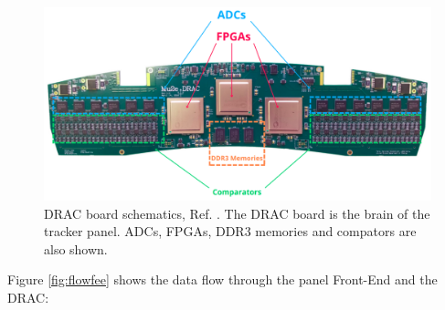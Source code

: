 \begin{figure}[!h]
\centering
\includegraphics[width =\textwidth]{figures/png/Screenshot_20240204_115052.png}
\caption[The DRAC board schematics.]{DRAC board schematics, Ref. \cite{drac}. 
The DRAC board is the brain of the tracker panel. ADCs, FPGAs, DDR3 
memories and compators are also shown.}
\label{fig:drac}
\end{figure}
Figure \ref{fig:flowfee} shows the data flow through the panel Front-End and the DRAC:
